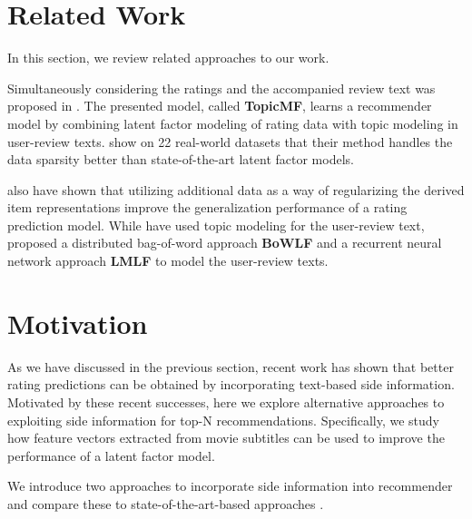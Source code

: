 \section{Related Work}
\label{st:related-work}
In this section, we review related approaches to our work.

Simultaneously considering the ratings and the accompanied review text was proposed in \cite{Bao2014}.
The presented model, called \textbf{TopicMF}, learns a recommender model by combining latent factor modeling of rating data with topic modeling in user-review texts.
\cite{Bao2014} show on 22 real-world datasets that their method handles the data sparsity better than state-of-the-art latent factor models.

\cite{Almahairi2015} also have shown that utilizing additional data as a way of regularizing the derived item representations improve the generalization performance of a rating prediction model.
While \cite{Bao2014} have used topic modeling for the user-review text, \cite{Almahairi2015} proposed a distributed bag-of-word approach \textbf{BoWLF} and a recurrent neural network approach \textbf{LMLF} to model the user-review texts.


\section{Motivation}
\label{st:motivation}

As we have discussed in the previous section, recent work has shown that better rating predictions can be obtained by incorporating text-based side information.
Motivated by these recent successes, here we explore alternative approaches to exploiting side information for top-N recommendations.
Specifically, we study how feature vectors extracted from movie subtitles can be used to improve the performance of a latent factor model.

We introduce two approaches to incorporate side information into recommender and compare these to state-of-the-art-based approaches \cite{Kabbur2015,Ning2011,Rendle2009}.
 